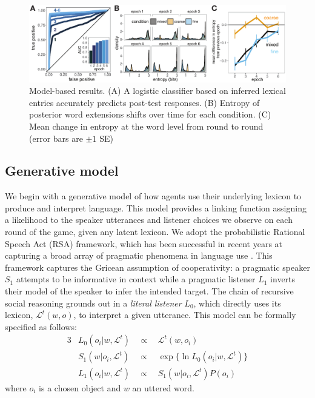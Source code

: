 \documentclass[10pt,letterpaper]{article}
\begin{document}
\begin{figure}[t]
\begin{center}
\includegraphics[scale=0.75]{modelFig.pdf}
{\caption{{Model-based results. (A) A logistic classifier based on inferred lexical entries accurately predicts post-test responses. (B) Entropy of  posterior word extensions shifts over time for each condition. (C) Mean change in entropy at the word level from round to round (error bars are $\pm 1$ SE)}  \label{fig:postTestPrediction}}}
\end{center}
\vspace{-3ex}
\end{figure}

\subsection{Generative model}

We begin with a generative model of how agents use their underlying lexicon to produce and interpret language. This model provides a linking function assigning a likelihood to the speaker utterances and listener choices we observe on each round of the game, given any latent lexicon. We adopt the probabilistic Rational Speech Act (RSA) framework, which has been successful in recent years at capturing a broad array of pragmatic phenomena in language use \cite{GoodmanFrank16_RSATiCS,FrankeJager16_ProbabilisticPragmatics}. This framework captures the Gricean assumption of cooperativity: a pragmatic speaker $S_1$ attempts to be informative in context while a pragmatic listener $L_1$ inverts their model of the speaker to infer the intended target. The chain of recursive social reasoning grounds out in a \emph{literal listener} $L_0$, which directly uses its lexicon, $\mathcal{L}^t(w,o)$, to interpret a given utterance. This model can be formally specified as follows:
\begin{alignat*}{3}
& L_0(o_i | w, \mathcal{L}^t) &\ \ \propto \ \ & \mathcal{L}^t(w,o_i) \\
& S_1(w | o_i, \mathcal{L}^t) &\ \ \propto \ \ & \exp\{\ln L_0(o_i | w, \mathcal{L}^t)\} \\
& L_1(o_i | w, \mathcal{L}^t) &\ \ \propto \ \ & S_1(w | o_i, \mathcal{L}^t) P(o_i) 
\end{alignat*}
where $o_i$ is a chosen object and $w$ an uttered word.
\end{document}
